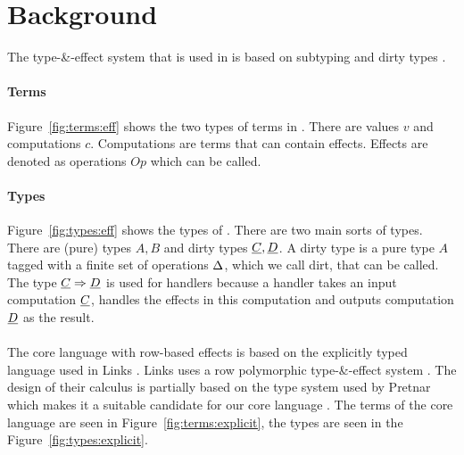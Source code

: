 \documentclass[sigplan,10pt]{acmart}\settopmatter{printfolios=true}
\begin{document}
\section{Background}
The type-\&-effect system that is used in \eff is based on subtyping and dirty types \cite{effectsystem}.

\paragraph{Terms}
Figure~\ref{fig:terms:eff} shows the two types of terms in \eff. There are values $v$ and computations $c$. Computations are terms that can contain effects. Effects are denoted as operations $Op$ which can be called.

\paragraph{Types}
Figure~\ref{fig:types:eff} shows the types of \eff. There are two main sorts of types. There are (pure) types $A, B$ and dirty types $\underline{C}, \underline{D}$. A dirty type is a pure type $A$ tagged with a finite set of operations $\Delta$, which we call dirt, that can be called. The type $\underline{C} \Rightarrow \underline{D}$ is used for handlers because a handler takes an input computation $\underline{C}$, handles the effects in this computation and outputs computation $\underline{D}$ as the result.\\
\\
The core language with row-based effects is based on the explicitly typed language used in Links \cite{row}. Links uses a row polymorphic type-\&-effect system . The design of their calculus is partially based on the type system used by Pretnar which makes it a suitable candidate for our core language \cite{pretnar2015introduction}. The terms of the core language are seen in Figure~\ref{fig:terms:explicit}, the types are seen in the Figure~\ref{fig:types:explicit}.
\end{document}
